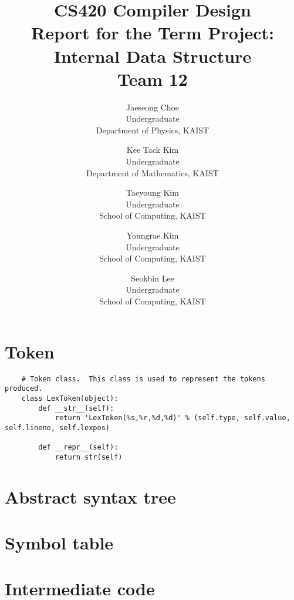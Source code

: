\documentclass{article}
\title
{
	CS420 Compiler Design\\
	Report for the Term Project: Internal Data Structure\\
	${}$\\
	Team 12
}
\author
{
	Jaeseong Choe\\
	Undergraduate\\
	Department of Physics, KAIST
	\and
	Kee Tack Kim\\
	Undergraduate\\
	Department of Mathematics, KAIST
	\and
	Taeyoung Kim\\
	Undergraduate\\
	School of Computing, KAIST
	\and
	Youngrae Kim\\
	Undergraduate\\
	School of Computing, KAIST
	\and
	Seokbin Lee\\
	Undergraduate\\
	School of Computing, KAIST
}
\begin{document}
	\maketitle
	
	\section{Token}
	
\begin{verbatim}
	# Token class.  This class is used to represent the tokens produced.
	class LexToken(object):
		def __str__(self):
			return 'LexToken(%s,%r,%d,%d)' % (self.type, self.value, self.lineno, self.lexpos)
		
		def __repr__(self):
			return str(self)
	\end{verbatim}
	
	\section{Abstract syntax tree}
	
	\section{Symbol table}
	
	\section{Intermediate code}
\end{document}
